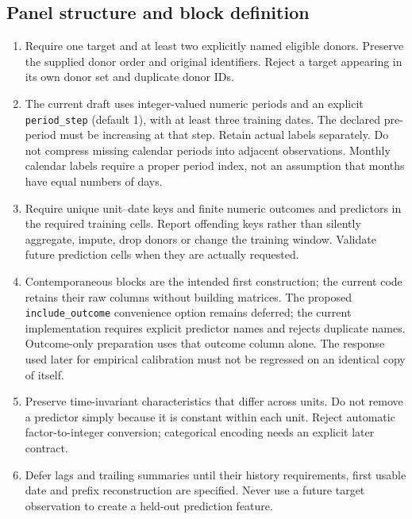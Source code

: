 \documentclass[11pt]{article}
\begin{document}
\subsection{Panel structure and block definition}
\begin{enumerate}
\item Require one target and at least two explicitly named eligible
donors. Preserve the supplied donor order and original identifiers.
Reject a target appearing in its own donor set and duplicate donor IDs.
\item The current draft uses integer-valued numeric periods and an explicit
\texttt{period\_step} (default 1), with at least three training dates.
The declared pre-period must be increasing at that step. Retain actual
labels separately. Do not compress missing calendar periods into adjacent
observations. Monthly calendar labels require a proper period index, not
an assumption that months have equal numbers of days.
\item Require unique unit--date keys and finite numeric outcomes and
predictors in the required training cells. Report offending keys rather
than silently aggregate, impute, drop donors or change the training window.
Validate future prediction cells when they are actually requested.
\item Contemporaneous blocks are the intended first construction; the
current code retains their raw columns without building matrices.
The proposed \texttt{include\_outcome} convenience option remains deferred;
the current implementation requires explicit predictor names and rejects
duplicate names. Outcome-only preparation uses that outcome column alone.
The response used later for empirical calibration must not be regressed
on an identical copy of itself.
\item Preserve time-invariant characteristics that differ across units.
Do not remove a predictor simply because it is constant within each unit.
Reject automatic factor-to-integer conversion; categorical encoding needs
an explicit later contract.
\item Defer lags and trailing summaries until their history requirements,
first usable date and prefix reconstruction are specified. Never use a
future target observation to create a held-out prediction feature.
\end{enumerate}
\end{document}
